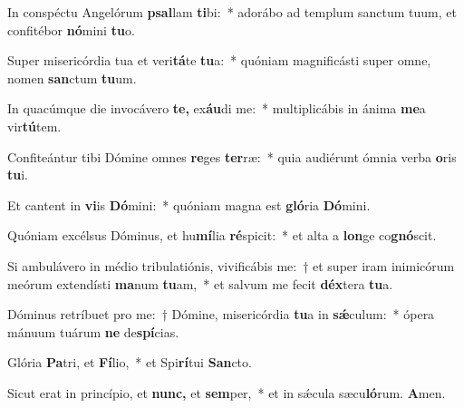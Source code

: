 \item In conspéctu Angelórum \textbf{psal}lam \textbf{ti}bi:~* adorábo ad templum sanctum tuum, et confitébor \textbf{nó}mini \textbf{tu}o.
\item Super misericórdia tua et veri\textbf{tá}te \textbf{tu}a:~* quóniam magnificásti super omne, nomen \textbf{san}ctum \textbf{tu}um.
\item In quacúmque die invocávero \textbf{te,} ex\textbf{áu}di me:~* multiplicábis in ánima \textbf{me}a vir\textbf{tú}tem.
\item Confiteántur tibi Dómine omnes \textbf{re}ges \textbf{ter}ræ:~* quia audiérunt ó\-mnia verba \textbf{o}ris \textbf{tu}i.
\item Et cantent in \textbf{vi}is \textbf{Dó}mini:~* quóniam magna est \textbf{gló}ria \textbf{Dó}mini.
\item Quóniam excélsus Dóminus, et hu\textbf{mí}lia \textbf{ré}spicit:~* et alta a \textbf{lon}ge co\textbf{gnó}scit.
\item Si ambulávero in médio tribulatiónis, vivificábis me:~† et super iram inimicórum meórum extendísti \textbf{ma}num \textbf{tu}am,~* et salvum me fecit \textbf{déx}tera \textbf{tu}a.
\item Dóminus retríbuet pro me:~† Dómine, misericórdia \textbf{tu}a in \textbf{sǽ}culum:~* ópera mánuum tuárum \textbf{ne} de\textbf{spí}cias.
\item Glória \textbf{Pa}tri, et \textbf{Fí}lio,~* et Spi\textbf{rí}tui \textbf{San}cto.
\item Sicut erat in princípio, et \textbf{nunc,} et \textbf{sem}per,~* et in sǽcula sæcu\textbf{ló}rum. \textbf{A}men.